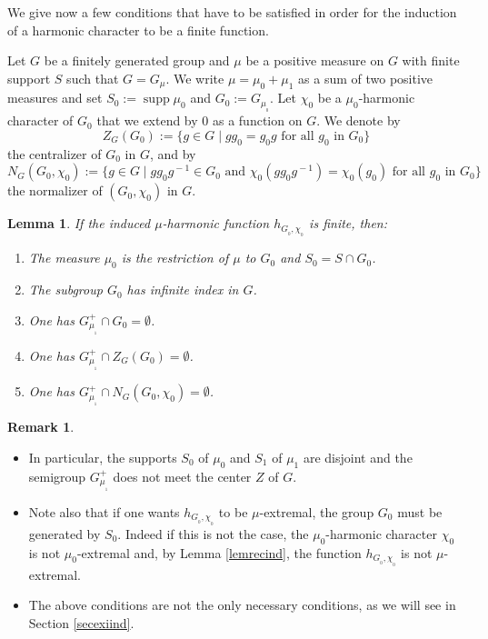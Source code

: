 \documentclass[11pt]{article}
\newcommand{\skpt}{\smallskip}
\numberwithin{equation}{section}
\newenvironment{enumeratei}
{\bgroup\def\theenumi{\roman{enumi}}\def\theenumii{\arabic{enumii}}\begin{enumerate}}
{\end{enumerate}\egroup}
\DeclareMathOperator{\supp}{supp}
\newtheorem{Lem}[Thm]{Lemma}
\theoremstyle{definition}
\newtheorem{Rem}[Thm]{Remark}
\let\bq\relax
\let\eq\relax
\begin{document}
\bq
We give now a few conditions that have to be satisfied
in order for the induction of a harmonic character to be a finite function.
\eq

Let $G$ be a finitely generated group and
$\mu$ be a positive measure on $G$ with finite support $S$
such that $G=G_\mu$.
We write $\mu =\mu_0+\mu_1$ as a sum of two positive measures
and set $S_0:=\supp\mu_0$ and $G_0:=G_{\mu_{_0}}$.
Let $\chi_0$ be a $\mu_0$-harmonic character of $G_0$
that we extend by $0$ as a function on $G$.
We denote by
\[
Z_G(G_0):=\{g\in G\mid gg_0=g_0g\text{ for all $g_0$ in $G_0$}\}
\]
the centralizer of $G_0$ in $G$, and by
\[
N_G(G_0,\chi_0):=\{g\in G\mid gg_0g^{\!-1}\!\!\in\! G_0
\text{ and } \chi_0(gg_0g^{\!-1})=\chi_0(g_0)\text{ for all $g_0$ in $G_0$}\}
\]
the normalizer of $(G_0,\chi_0)$ in $G$.

\begin{Lem}
\label{lemindcha}
If the induced $\mu$-harmonic function $h_{G_{_0},\chi_{_0}}$ is finite, then:
\begin{enumeratei}
\item\label{lemindchai}
The measure $\mu_0$ is the restriction of $\mu$ to $G_0$ and $S_0=S\cap G_0$.
\item\label{lemindchaii}
The subgroup $G_0$ has infinite index in $G$.
\item\label{lemindchaiii}
One has $G_{\mu_{_1}}^+\cap G_0=\emptyset$.
\item\label{lemindchaiv}
One has $G_{\mu_{_1}}^+\cap Z_G(G_0)=\emptyset$.
\item\label{lemindchav}
One has $G_{\mu_{_1}}^+\cap N_G(G_0,\chi_0)=\emptyset$.
\end{enumeratei}
\end{Lem}

\skpt
\begin{Rem}
\begin{itemize}
\item
In particular, the supports $S_0$ of $\mu_0$ and $S_1$ of $\mu_1$ are disjoint
and the semigroup $G_{\mu_{_1}}^+$ does not meet the center $Z$ of $G$.

\item
Note also that if one wants $h_{G_{_0},\chi_{_0}}$ to be $\mu$-extremal, the group
$G_0$ must be generated by $S_0$. Indeed if this is not the case,
the $\mu_0$-harmonic character $\chi_0$ is not $\mu_0$-extremal and,
by Lemma \ref{lemrecind},
the function $h_{G_{_0},\chi_{_0}}$ is not $\mu$-extremal.

\item
The above conditions are not the only necessary conditions,
as we will see in Section \ref{secexiind}.

\end{itemize}
\end{Rem}
\end{document}
